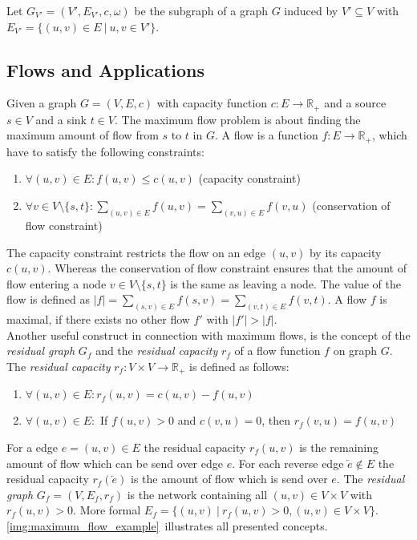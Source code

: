 \begin{definition}
Let $G_{V'} = (V',E_{V'},c,\omega)$ be the subgraph of a graph $G$
induced by $V' \subseteq V$ with $E_{V'} = \{(u,v) \in E\ |\ u,v \in V'\}$.
\label{def:subgraph}
\end{definition}


\subsection{Flows and Applications}
\label{sec:applications}

Given a graph $G = (V,E,c)$ with capacity function $c: E \rightarrow \mathbb{R}_+$ and a source 
$s \in V$ and a sink $t \in V$. The maximum flow problem is about finding 
the maximum amount of flow from $s$ to $t$ in $G$. A flow is a function 
$f: E \rightarrow \mathbb{R}_+$, which have to satisfy the following constraints:
\begin{enumerate}
\item $\forall (u,v) \in E: f(u,v) \le c(u,v)$ (capacity constraint)
\item $\forall v \in V \setminus \{s,t\}: \sum_{(u,v) \in E} f(u,v) = \sum_{(v,u) \in E} f(v,u)$ (conservation of flow constraint)
\end{enumerate}
The capacity constraint restricts the flow on an edge $(u,v)$ by its capacity 
$c(u,v)$. Whereas the conservation of flow constraint ensures that the amount
of flow entering a node $v \in V \setminus \{s,t\}$ is the same as leaving a node.
The value of the flow is defined as $|f| = \sum_{(s,v) \in E} f(s,v) = \sum_{(v,t) \in E} f(v,t)$.
A flow $f$ is maximal, if there exists no other flow $f'$ with $|f'| > |f|$. \\
Another useful construct in connection with maximum flows, is the concept of the
\emph{residual graph} $G_f$ and the \emph{residual capacity} $r_f$ of a flow function $f$ on graph $G$.
The \emph{residual capacity} $r_f: V \times V \rightarrow \mathbb{R}_+$ is defined as follows:
\begin{enumerate}
\item $\forall (u,v) \in E: r_f(u,v) = c(u,v) - f(u,v)$
\item $\forall (u,v) \in E:$ If $f(u,v) > 0$ and $c(v,u) = 0$, then $r_f(v,u) = f(u,v)$
\end{enumerate}
For a edge $e = (u,v) \in E$ the residual capacity $r_f(u,v)$ is the remaining amount of 
flow which can be send over edge $e$. For each reverse edge $\overleftarrow{e} \notin E$ the
residual capacity $r_f(\overleftarrow{e})$ is the amount of flow which is send over $e$.
The \emph{residual graph} $G_f = (V,E_f,r_f)$ is the network containing all $(u,v) \in V \times V$
with $r_f(u,v) > 0$. More formal $E_f = \{(u,v)\ |\ r_f(u,v) > 0, (u,v) \in V \times V\}$.
\autoref{img:maximum_flow_example}~illustrates all presented concepts.

